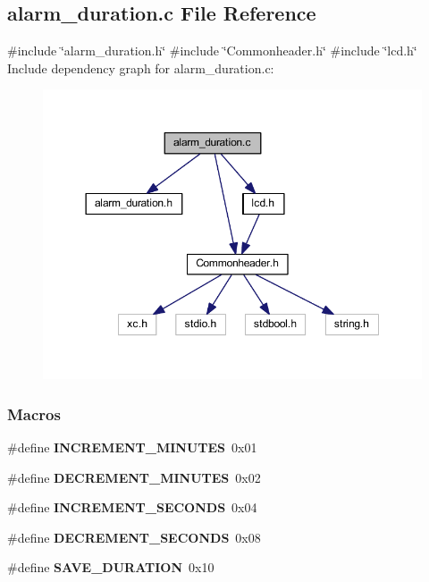 \subsection{alarm\+\_\+duration.\+c File Reference}
\label{a00002}
{\ttfamily \#include \char`\"{}alarm\+\_\+duration.\+h\char`\"{}}\newline
{\ttfamily \#include \char`\"{}Commonheader.\+h\char`\"{}}\newline
{\ttfamily \#include \char`\"{}lcd.\+h\char`\"{}}\newline
Include dependency graph for alarm\+\_\+duration.\+c\+:
\nopagebreak
\begin{figure}[H]
\begin{center}
\leavevmode
\includegraphics[width=350pt]{a00003}
\end{center}
\end{figure}
\subsubsection*{Macros}
\begin{DoxyCompactItemize}
\item 
\#define \textbf{ I\+N\+C\+R\+E\+M\+E\+N\+T\+\_\+\+M\+I\+N\+U\+T\+ES}~0x01
\item 
\#define \textbf{ D\+E\+C\+R\+E\+M\+E\+N\+T\+\_\+\+M\+I\+N\+U\+T\+ES}~0x02
\item 
\#define \textbf{ I\+N\+C\+R\+E\+M\+E\+N\+T\+\_\+\+S\+E\+C\+O\+N\+DS}~0x04
\item 
\#define \textbf{ D\+E\+C\+R\+E\+M\+E\+N\+T\+\_\+\+S\+E\+C\+O\+N\+DS}~0x08
\item 
\#define \textbf{ S\+A\+V\+E\+\_\+\+D\+U\+R\+A\+T\+I\+ON}~0x10
\end{DoxyCompactItemize}
